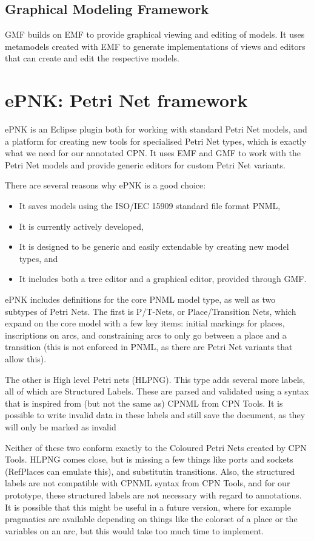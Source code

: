 	\subsection{Graphical Modeling Framework}
	GMF builds on EMF to provide graphical viewing and editing of models. It uses
	metamodels created with EMF to generate implementations of views and editors
	that can create and edit the respective models. 

\section{ePNK: Petri Net framework}
ePNK is an Eclipse plugin both for working with standard Petri Net models, and a
platform for creating new tools for specialised Petri Net types, which is
exactly what we need for our annotated CPN. It uses EMF and GMF to work with the
Petri Net models and provide generic editors for custom Petri Net variants.

There are several reasons why ePNK is a good choice:
\begin{itemize}
	\item It saves models using the ISO/IEC 15909  standard file
	format PNML,
	\item It is currently actively developed,
	\item It is designed to be generic and easily extendable by creating new model
	types, and
	\item It includes both a tree editor and a graphical editor, provided through
	GMF.
\end{itemize}

ePNK includes definitions for the core PNML model type, as well as two
subtypes of Petri Nets. The first is P/T-Nets, or Place/Transition Nets, which
expand on the core model with a few key items: initial markings for places,
inscriptions on arcs, and constraining arcs to only go between a place and a
transition (this is not enforced in PNML, as there are Petri Net variants that
allow this). 

The other is High level Petri nets (HLPNG). This type adds several more labels,
all of which are Structured Labels. These are parsed and validated using a
syntax that is inspired from (but not the same as) CPNML from CPN Tools. It is
possible to write invalid data in these labels and still save the document, as
they will only be marked as invalid

Neither of these two conform exactly to the Coloured Petri Nets created by CPN
Tools. HLPNG comes close, but is missing a few things like ports and sockets
(RefPlaces can emulate this), and substitutin transitions. Also, the
structured labels are not compatible with CPNML syntax from CPN Tools, and for
our prototype, these structured labels are not necessary with regard to
annotations. It is possible that this might be useful in a future version,
where for example pragmatics are available depending on things like the
colorset of a place or the variables on an arc, but this would take too much
time to implement. 

